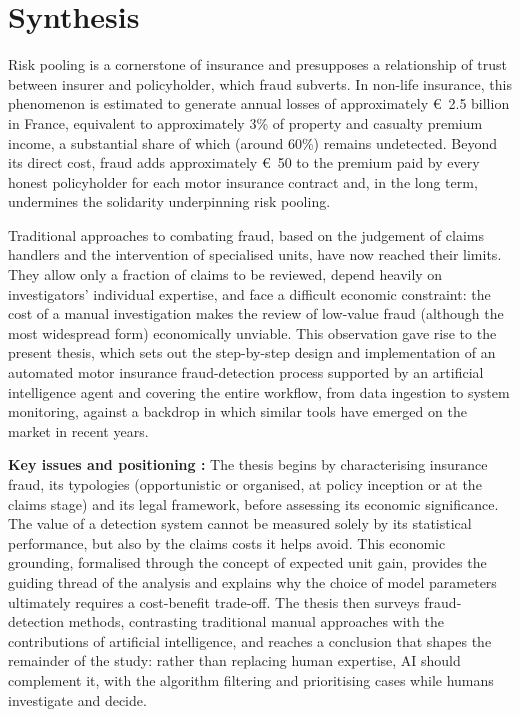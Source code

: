 \chapter*{Synthesis}
{}

%

Risk pooling is a cornerstone of insurance and presupposes a relationship of trust between insurer and policyholder, which fraud subverts.
In non-life insurance, this phenomenon is estimated to generate annual losses of approximately \euro{}~2.5 billion in France, equivalent to approximately 3\% of property and casualty premium income, a substantial share of which (around 60\%) remains undetected. Beyond its direct cost, fraud adds approximately \euro{}~50 to the premium paid by every honest policyholder for each motor insurance contract and, in the long term, undermines the solidarity underpinning risk pooling.

Traditional approaches to combating fraud, based on the judgement of claims handlers and the intervention of specialised units, have now reached their limits. They allow only a fraction of claims to be reviewed, depend heavily on investigators' individual expertise, and face a difficult economic constraint: the cost of a manual investigation makes the review of low-value fraud (although the most widespread form) economically unviable. This observation gave rise to the present thesis, which sets out the step-by-step design and implementation of an automated motor insurance fraud-detection process supported by an artificial intelligence agent and covering the entire workflow, from data ingestion to system monitoring, against a backdrop in which similar tools have emerged on the market in recent years.

\bigskip

\textbf{Key issues and positioning :} The thesis begins by characterising insurance fraud, its typologies (opportunistic or organised, at policy inception or at the claims stage) and its legal framework, before assessing its economic significance. The value of a detection system cannot be measured solely by its statistical performance, but also by the claims costs it helps avoid. This economic grounding, formalised through the concept of expected unit gain, provides the guiding thread of the analysis and explains why the choice of model parameters ultimately requires a cost-benefit trade-off. The thesis then surveys fraud-detection methods, contrasting traditional manual approaches with the contributions of artificial intelligence, and reaches a conclusion that shapes the remainder of the study: rather than replacing human expertise, AI should complement it, with the algorithm filtering and prioritising cases while humans investigate and decide.

